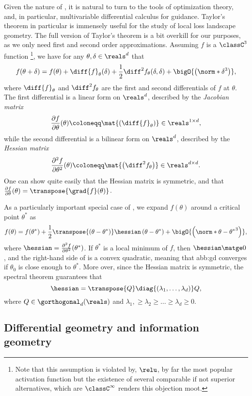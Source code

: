 Given the nature of ,
it is natural to turn to the tools of optimization theory,
and, in particular, multivariable differential calculus for guidance.
Taylor's theorem in particular is immensely useful for the study of local loss landscape geometry.
The full version of Taylor's theorem is a bit overkill for our purposes,
as we only need first and second order approximations.
Assuming \(f\) is a \(\classC^{3}\) function%
\footnote{%
	Note that this assumption is violated by, \(\relu\),
	by far the most popular activation function
	but the existence of several comparable if not superior alternatives,
	which are \(\classC^{\infty}\) renders this objection moot.
}, we have for any \(\theta,\delta\in\reals^{d}\) that
\begin{equation}\label{eq:taylor2}
	f(\theta+\delta) = f(\theta) + \diff{f}_{\theta}(\delta) +
	\frac{1}{2}\diff^{2}{f}_{\theta}(\delta, \delta) + \bigO{\left( \norm*{\delta}^{3} \right)},
\end{equation}
where \(\diff{f}_{\theta}\) and \(\diff^{2}{f}_{\theta}\)
are the first and second differentials of \(f\) at \(\theta\).
The first differential is a linear form on \(\reals^{d}\),
described by the \emph{Jacobian matrix}
\begin{equation}\label{eq:jacobian}
	\frac{\partial f}{\partial \theta}(\theta) \coloneqq \mat{\left( \diff{f}_{\theta} \right)}
	\in \reals^{1\times d},
\end{equation}
while the second differential is a bilinear form on \(\reals^{d}\),
described by the \emph{Hessian matrix}
\begin{equation}\label{eq:hessian}
	\frac{\partial^{2} f}{\partial \theta^{2}}(\theta) \coloneqq \mat{\left( \diff^{2}{f}_{\theta} \right)}
	\in \reals^{d\times d}.
\end{equation}
One can show quite easily that the Hessian matrix is symmetric, and that
\(\frac{\partial f}{\partial \theta}(\theta)=\transpose{\grad{f}(\theta)}\).

As a particularly important special case of ,
we expand \(f(\theta)\) around a critical point \(\theta^{\ast}\) as
\begin{equation}\label{eq:critical-vec-taylor2}
	f(\theta) = f(\theta^{\ast}) + \frac{1}{2}\transpose{\left( \theta - \theta^{\ast} \right)}
	\hessian\left( \theta - \theta^{\ast} \right) +
	\bigO{\left( \norm*{\theta - \theta^{\ast}}^{3} \right)},
\end{equation}
where \(\hessian = \frac{\partial^{2} f}{\partial \theta^{2}}(\theta^{\ast})\).
If \(\theta^{\ast}\) is a local minimum of \(f\), then \(\hessian \matge 0\),
and the right-hand side of  is a convex quadratic,
meaning that \gls{abb:gd} converges if \(\theta_{0}\) is close enough to \(\theta^{\ast}\).
More over, since the Hessian matrix is symmetric, the spectral theorem guarantees that
\begin{equation}\label{eq:heissian-diagonalization}
	\hessian = \transpose{Q} \diag{(\lambda_{1},\ldots,\lambda_{d})} Q,
\end{equation}
where \(Q\in\gorthogonal_d{(\reals)}\)
and \(\lambda_{1},\ge\lambda_{2}\ge\dots\ge\lambda_{d}\ge 0\).

\subsection{Differential geometry and information geometry}\label{sub:background:geometry}